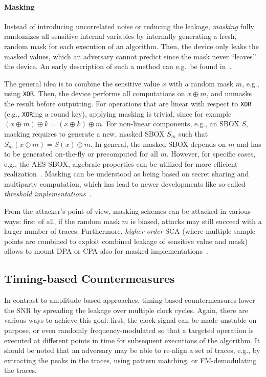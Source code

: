 \paragraph{Masking}
Instead of introducing uncorrelated noise or reducing the leakage, \emph{masking} fully randomizes all sensitive internal variables by internally generating a fresh, random mask for each execution of an algorithm. Then, the device only leaks the masked values, which an adversary cannot predict since the mask never ``leaves'' the device. An early description of such a method can e.g.~be found in~\cite{chari1999towards}.

The general idea is to combine the sensitive value $x$ with a random mask $m$, e.g., using \verb+XOR+. Then, the device performs all computations on $x \oplus m$, and unmasks the result before outputting. For operations that are linear with respect to \verb+XOR+ (e.g., \verb+XOR+ing a round key), applying masking is trivial, since for example $\left(x \oplus m\right) \oplus k = \left(x \oplus k\right) \oplus m$.
%
For non-linear components, e.g., an \ac{SBOX} $S$, masking requires to generate a new, masked \ac{SBOX} $S_m$ such that $S_m\left(x \oplus m\right) = S\left(x\right) \oplus m$. In general, the masked \ac{SBOX} depends on $m$ and has to be generated on-the-fly or precomputed for all $m$. However, for specific cases, e.g., the \ac{AES} \ac{SBOX}, algebraic properties can be utilized for more efficient realization~\cite{oswald2005side,canright2008very}.
%
Masking can be understood as being based on secret sharing and multiparty computation, which has lead to newer developments like so-called \emph{threshold implementations}~\cite{nikova2006threshold}.

From the attacker's point of view, masking schemes can be attacked in various ways: first of all, if the random mask $m$ is biased, attacks may still succeed with a larger number of traces. Furthermore, \emph{higher-order} \ac{SCA} (where multiple sample points are combined to exploit combined leakage of sensitive value and mask) allows to mount \ac{DPA} or \ac{CPA} also for masked implementations~\cite{oswald2006practical}.

\subsection{Timing-based Countermeasures}
In contrast to amplitude-based approaches, timing-based countermeasures lower the \ac{SNR} by spreading the leakage over multiple clock cycles. Again, there are various ways to achieve this goal: 
first, the clock signal can be made unstable on purpose, or even randomly frequency-modulated so that a targeted operation is executed at different points in time for subsequent executions of the algorithm. It should be noted that an adversary may be able to re-align a set of traces, e.g., by extracting the peaks in the traces, using pattern matching, or \acs{FM}-demodulating the traces.

